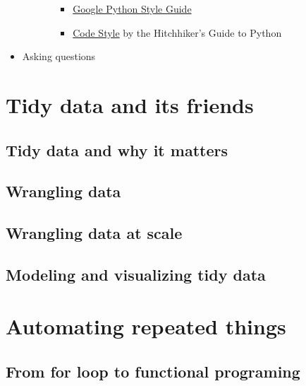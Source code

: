 \documentclass[
]{book}
\providecommand{\tightlist}{%
  \setlength{\itemsep}{0pt}\setlength{\parskip}{0pt}}
\begin{document}
\begin{itemize}
\begin{itemize}
\begin{itemize}
      \begin{itemize}
      \tightlist
      \item
        \href{https://github.com/google/styleguide/blob/gh-pages/pyguide.md}{Google Python Style Guide}
      \item
        \href{https://docs.python-guide.org/writing/style/\#zen-of-python}{Code Style} by the Hitchhiker's Guide to Python
      \end{itemize}
    \end{itemize}
  \end{itemize}
\item
  Asking questions
\end{itemize}

\hypertarget{tidy_data}{%
\chapter{Tidy data and its friends}\label{tidy_data}}

\hypertarget{tidy-data-and-why-it-matters}{%
\section{Tidy data and why it matters}\label{tidy-data-and-why-it-matters}}

\hypertarget{wrangling-data}{%
\section{Wrangling data}\label{wrangling-data}}

\hypertarget{wrangling-data-at-scale}{%
\section{Wrangling data at scale}\label{wrangling-data-at-scale}}

\hypertarget{modeling-and-visualizing-tidy-data}{%
\section{Modeling and visualizing tidy data}\label{modeling-and-visualizing-tidy-data}}

\hypertarget{functional_programming}{%
\chapter{Automating repeated things}\label{functional_programming}}

\hypertarget{from-for-loop-to-functional-programing}{%
\section{From for loop to functional programing}\label{from-for-loop-to-functional-programing}}
\end{document}
